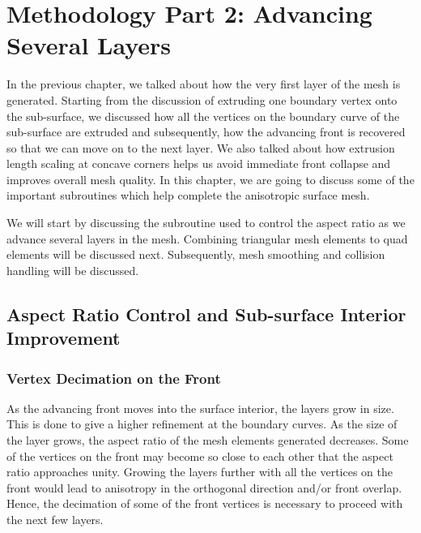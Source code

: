 \chapter{Methodology Part 2: Advancing Several Layers}

In the previous chapter, we talked about how the very first layer of the mesh is generated. Starting from the discussion of extruding one boundary vertex onto the sub-surface, we discussed how all the vertices on the boundary curve of the sub-surface are extruded and subsequently, how the advancing front is recovered so that we can move on to the next layer. We also talked about how extrusion length scaling at concave corners helps us avoid immediate front collapse and improves overall mesh quality. In this chapter, we are going to discuss some of the important subroutines which help complete the anisotropic surface mesh.

We will start by discussing the subroutine used to control the aspect ratio as we advance several layers in the mesh. Combining triangular mesh elements to quad elements will be discussed next. Subsequently, mesh smoothing and collision handling will be discussed.

\section{Aspect Ratio Control and Sub-surface Interior Improvement}

\subsection{Vertex Decimation on the Front}
\label{aspectRatioControl}

As the advancing front moves into the surface interior, the layers grow in size. This is done to give a higher refinement at the boundary curves. As the size of the layer grows, the aspect ratio of the mesh elements generated decreases. Some of the vertices on the front may become so close to each other that the aspect ratio approaches unity. Growing the layers further with all the vertices on the front would lead to anisotropy in the orthogonal direction and/or front overlap. Hence, the decimation of some of the front vertices is necessary to proceed with the next few layers.

